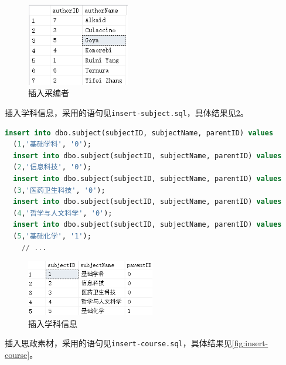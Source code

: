 \documentclass[11pt]{article}
\begin{document}
  \begin{figure}[h]
    \centering
    \includegraphics[width=0.4\textwidth]{insert.png}
    \caption{插入采编者}
    \label{fig:insert}
  \end{figure}

  插入学科信息，采用的语句见\verb|insert-subject.sql|，具体结果见\ref{fig:insert-subject}。

  \begin{file}
    \begin{lstlisting}[language=sql]
  insert into dbo.subject(subjectID, subjectName, parentID) values
  (1,'基础学科', '0');
  insert into dbo.subject(subjectID, subjectName, parentID) values
  (2,'信息科技', '0');
  insert into dbo.subject(subjectID, subjectName, parentID) values
  (3,'医药卫生科技', '0');
  insert into dbo.subject(subjectID, subjectName, parentID) values
  (4,'哲学与人文科学', '0');
  insert into dbo.subject(subjectID, subjectName, parentID) values
  (5,'基础化学', '1');
    // ...
    \end{lstlisting}
  \end{file}

  \begin{figure}[h]
    \centering
    \includegraphics[width=0.5\textwidth]{insert-subject.png}
    \caption{插入学科信息}
    \label{fig:insert-subject}
  \end{figure}

  插入思政素材，采用的语句见\verb|insert-course.sql|，具体结果见\ref{fig:insert-course}。
\end{document}
